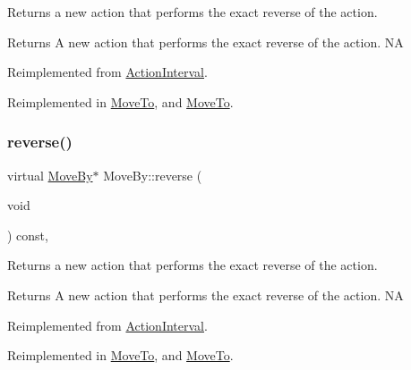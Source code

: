 Returns a new action that performs the exact reverse of the action.

\begin{DoxyReturn}{Returns}
A new action that performs the exact reverse of the action.  NA 
\end{DoxyReturn}


Reimplemented from \hyperlink{classActionInterval_a9f9ac7164036a0bc261a72f62a2b2da7}{Action\+Interval}.



Reimplemented in \hyperlink{classMoveTo_a6113c5521a72f5e4a8ce56df5ab50722}{Move\+To}, and \hyperlink{classMoveTo_afb568e581e69aad40f815e48eb13cb54}{Move\+To}.

\mbox{\label{classMoveBy_a5b1077bc56798449c06f216572345a5b}} 
\subsubsection{\texorpdfstring{reverse()}{reverse()}\hspace{0.1cm}{\footnotesize\ttfamily [2/2]}}
{\footnotesize\ttfamily virtual \hyperlink{classMoveBy}{Move\+By}$\ast$ Move\+By\+::reverse (\begin{DoxyParamCaption}\item[{void}]{ }\end{DoxyParamCaption}) const\hspace{0.3cm}{\ttfamily [override]}, {\ttfamily [virtual]}}

Returns a new action that performs the exact reverse of the action.

\begin{DoxyReturn}{Returns}
A new action that performs the exact reverse of the action.  NA 
\end{DoxyReturn}


Reimplemented from \hyperlink{classActionInterval_a9f9ac7164036a0bc261a72f62a2b2da7}{Action\+Interval}.



Reimplemented in \hyperlink{classMoveTo_a6113c5521a72f5e4a8ce56df5ab50722}{Move\+To}, and \hyperlink{classMoveTo_afb568e581e69aad40f815e48eb13cb54}{Move\+To}.

\mbox{\label{classMoveBy_ab83e2fe86e82757fa11cb734a4971a5f}} 
